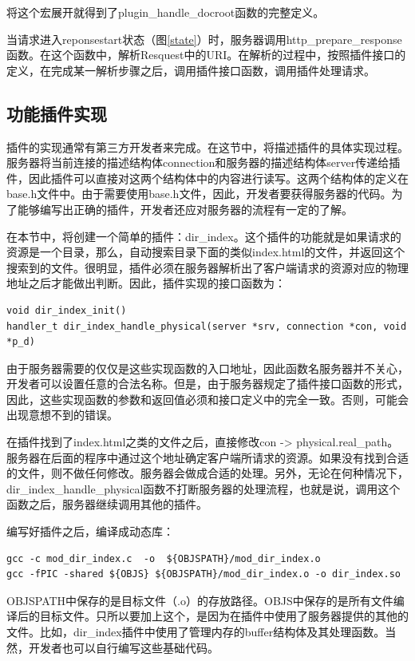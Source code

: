 \documentclass[12pt, twoside, a4paper, xetex]{report}
\begin{document}
	将这个宏展开就得到了plugin\_handle\_docroot函数的完整定义。
	
	当请求进入reponsestart状态（图\ref{state}）时，服务器调用http\_prepare\_response函数。在这个函数中，解析Resquest中的URI。在解析的过程中，按照插件接口的定义，在完成某一解析步骤之后，调用插件接口函数，调用插件处理请求。
	
	\subsection{功能插件实现}
	
	插件的实现通常有第三方开发者来完成。在这节中，将描述插件的具体实现过程。服务器将当前连接的描述结构体connection和服务器的描述结构体server传递给插件，因此插件可以直接对这两个结构体中的内容进行读写。这两个结构体的定义在base.h文件中。由于需要使用base.h文件，因此，开发者要获得服务器的代码。为了能够编写出正确的插件，开发者还应对服务器的流程有一定的了解。
	
	在本节中，将创建一个简单的插件：dir\_index。这个插件的功能就是如果请求的资源是一个目录，那么，自动搜索目录下面的类似index.html的文件，并返回这个搜索到的文件。很明显，插件必须在服务器解析出了客户端请求的资源对应的物理地址之后才能做出判断。因此，插件实现的接口函数为：
	
	\begin{verbatim}
void dir_index_init()
handler_t dir_index_handle_physical(server *srv, connection *con, void *p_d)
	\end{verbatim}
	
	由于服务器需要的仅仅是这些实现函数的入口地址，因此函数名服务器并不关心，开发者可以设置任意的合法名称。但是，由于服务器规定了插件接口函数的形式，因此，这些实现函数的参数和返回值必须和接口定义中的完全一致。否则，可能会出现意想不到的错误。
	
	在插件找到了index.html之类的文件之后，直接修改con -> physical.real\_path。服务器在后面的程序中通过这个地址确定客户端所请求的资源。如果没有找到合适的文件，则不做任何修改。服务器会做成合适的处理。另外，无论在何种情况下，dir\_index\_handle\_physical函数不打断服务器的处理流程，也就是说，调用这个函数之后，服务器继续调用其他的插件。
	
	编写好插件之后，编译成动态库：
	
	\begin{verbatim}
gcc -c mod_dir_index.c  -o  ${OBJSPATH}/mod_dir_index.o
gcc -fPIC -shared ${OBJS} ${OBJSPATH}/mod_dir_index.o -o dir_index.so
	\end{verbatim}
	
	OBJSPATH中保存的是目标文件（.o）的存放路径。OBJS中保存的是所有文件编译后的目标文件。只所以要加上这个，是因为在插件中使用了服务器提供的其他的文件。比如，dir\_index插件中使用了管理内存的buffer结构体及其处理函数。当然，开发者也可以自行编写这些基础代码。
	
\end{document}
